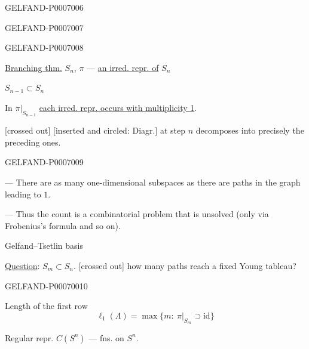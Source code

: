 \begin{GelfandAdjacentEvidence}{GELFAND-P000700}{6}

\end{GelfandAdjacentEvidence}
\begin{GelfandAdjacentEvidence}{GELFAND-P000700}{7}

\end{GelfandAdjacentEvidence}
\begin{GelfandAdjacentEvidence}{GELFAND-P000700}{8}


\underline{Branching thm.}\qquad
\(S_n\), \(\pi\) --- \underline{an irred. repr. of} \(S_n\)

\(S_{n-1}\subset S_n\)

In \(\pi|_{S_{n-1}}\) \underline{each irred. repr. occurs with multiplicity 1}.

[crossed out] [inserted and circled: Diagr.] at step \(n\) decomposes into precisely the preceding ones.
\end{GelfandAdjacentEvidence}
\begin{GelfandAdjacentEvidence}{GELFAND-P000700}{9}


--- There are as many one-dimensional subspaces as there are paths in the graph leading to \(1\).

--- Thus the count is a combinatorial problem that is unsolved (only via Frobenius’s formula and so on).

Gelfand–Tsetlin basis

\underline{Question}: \(S_m\subset S_n\). [crossed out] how many paths reach a fixed Young tableau?
\end{GelfandAdjacentEvidence}
\begin{GelfandAdjacentEvidence}{GELFAND-P000700}{10}


Length of the first row
\[
\ell_1(\Lambda)=\max\{m:\ \pi|_{S_m}\supset\mathrm{id}\}
\]

Regular repr. \(C(S^n)\) --- fns. on \(S^n\).
\end{GelfandAdjacentEvidence}
